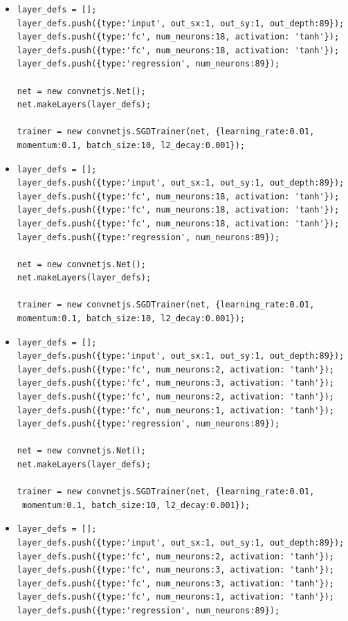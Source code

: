 \begin{itemize}
\item \begin{verbatim}
layer_defs = [];
layer_defs.push({type:'input', out_sx:1, out_sy:1, out_depth:89});
layer_defs.push({type:'fc', num_neurons:18, activation: 'tanh'});
layer_defs.push({type:'fc', num_neurons:18, activation: 'tanh'});
layer_defs.push({type:'regression', num_neurons:89});

net = new convnetjs.Net();
net.makeLayers(layer_defs);

trainer = new convnetjs.SGDTrainer(net, {learning_rate:0.01, 
momentum:0.1, batch_size:10, l2_decay:0.001});
\end{verbatim}

\item \begin{verbatim}
layer_defs = [];
layer_defs.push({type:'input', out_sx:1, out_sy:1, out_depth:89});
layer_defs.push({type:'fc', num_neurons:18, activation: 'tanh'});
layer_defs.push({type:'fc', num_neurons:18, activation: 'tanh'});
layer_defs.push({type:'fc', num_neurons:18, activation: 'tanh'});
layer_defs.push({type:'regression', num_neurons:89});

net = new convnetjs.Net();
net.makeLayers(layer_defs);

trainer = new convnetjs.SGDTrainer(net, {learning_rate:0.01, 
momentum:0.1, batch_size:10, l2_decay:0.001});
\end{verbatim}

\item \begin{verbatim}
layer_defs = [];
layer_defs.push({type:'input', out_sx:1, out_sy:1, out_depth:89});
layer_defs.push({type:'fc', num_neurons:2, activation: 'tanh'});
layer_defs.push({type:'fc', num_neurons:3, activation: 'tanh'});
layer_defs.push({type:'fc', num_neurons:2, activation: 'tanh'});
layer_defs.push({type:'fc', num_neurons:1, activation: 'tanh'});
layer_defs.push({type:'regression', num_neurons:89});

net = new convnetjs.Net();
net.makeLayers(layer_defs);

trainer = new convnetjs.SGDTrainer(net, {learning_rate:0.01,
 momentum:0.1, batch_size:10, l2_decay:0.001});
\end{verbatim}

\item \begin{verbatim}
layer_defs = [];
layer_defs.push({type:'input', out_sx:1, out_sy:1, out_depth:89});
layer_defs.push({type:'fc', num_neurons:2, activation: 'tanh'});
layer_defs.push({type:'fc', num_neurons:3, activation: 'tanh'});
layer_defs.push({type:'fc', num_neurons:3, activation: 'tanh'});
layer_defs.push({type:'fc', num_neurons:1, activation: 'tanh'});
layer_defs.push({type:'regression', num_neurons:89});


\end{verbatim}
\end{itemize}
